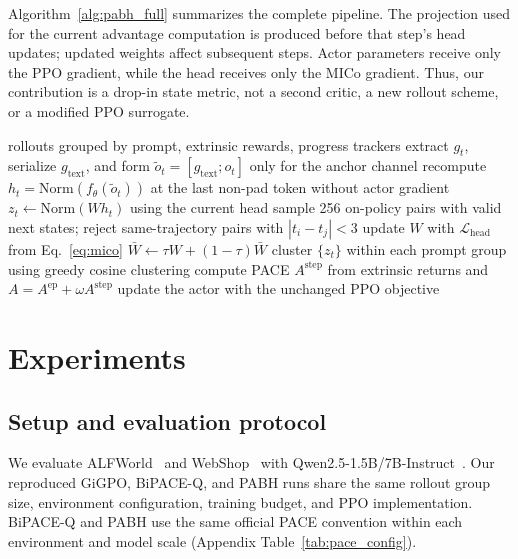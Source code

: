 \documentclass[10pt,twocolumn,letterpaper]{article}
\newcommand{\method}{PABH\xspace}
\newcommand{\Aepisode}{A^{\mathrm{ep}}}
\newcommand{\Astep}{A^{\mathrm{step}}}
\begin{document}
Algorithm~\ref{alg:pabh_full} summarizes the complete pipeline. The projection used for the current advantage computation is produced before that step's head updates; updated weights affect subsequent steps. Actor parameters receive only the PPO gradient, while the head receives only the MICo gradient. Thus, our contribution is a drop-in state metric, not a second critic, a new rollout scheme, or a modified PPO surrogate.

\begin{algorithm*}[!t]
\caption{PABH training and advantage computation}
\label{alg:pabh_full}
\begin{algorithmic}[1]
\Require rollouts grouped by prompt, extrinsic rewards, progress trackers
  \State extract $g_t$, serialize $g_{\mathrm{text}}$, and form $\tilde o_t=[g_{\mathrm{text}};o_t]$ only for the anchor channel
  \State recompute $h_t=\mathrm{Norm}(f_\theta(\tilde o_t))$ at the last non-pad token without actor gradient
  \State $z_t\leftarrow\mathrm{Norm}(Wh_t)$ using the current head
    \State sample 256 on-policy pairs with valid next states; reject same-trajectory pairs with $|t_i-t_j|<3$
      \State update $W$ with $\mathcal L_{\mathrm{head}}$ from Eq.~\ref{eq:mico}
      \State $\bar W\leftarrow\tau W+(1-\tau)\bar W$
    \EndFor
  \EndFor
  \State cluster $\{z_t\}$ within each prompt group using greedy cosine clustering
  \State compute PACE $\Astep$ from extrinsic returns and $A=\Aepisode+\omega\Astep$
  \State update the actor with the unchanged PPO objective
\EndFor
\end{algorithmic}
\end{algorithm*}

\section{Experiments}
\label{sec:exp}

\subsection{Setup and evaluation protocol}
We evaluate ALFWorld~\cite{alfworld} and WebShop~\cite{webshop} with Qwen2.5-1.5B/7B-Instruct~\cite{qwen}. Our reproduced GiGPO, BiPACE-Q, and \method runs share the same rollout group size, environment configuration, training budget, and PPO implementation. BiPACE-Q and \method use the same official PACE convention within each environment and model scale (Appendix Table~\ref{tab:pace_config}).
\end{document}
